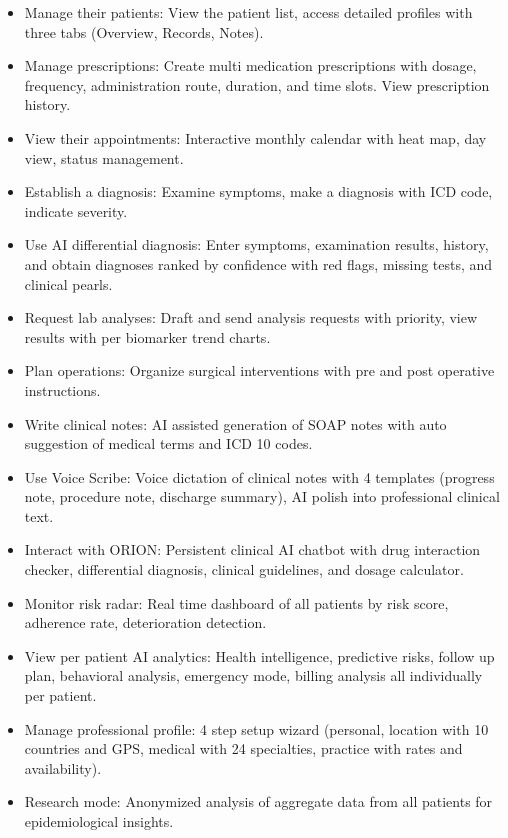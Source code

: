 \documentclass[12pt,a4paper,oneside]{report}
\begin{document}
\begin{itemize}
    \item Manage their patients: View the patient list, access detailed profiles with three tabs (Overview, Records, Notes).
    \item Manage prescriptions: Create multi medication prescriptions with dosage, frequency, administration route, duration, and time slots. View prescription history.
    \item View their appointments: Interactive monthly calendar with heat map, day view, status management.
    \item Establish a diagnosis: Examine symptoms, make a diagnosis with ICD code, indicate severity.
    \item Use AI differential diagnosis: Enter symptoms, examination results, history, and obtain diagnoses ranked by confidence with red flags, missing tests, and clinical pearls.
    \item Request lab analyses: Draft and send analysis requests with priority, view results with per biomarker trend charts.
    \item Plan operations: Organize surgical interventions with pre and post operative instructions.
    \item Write clinical notes: AI assisted generation of SOAP notes with auto suggestion of medical terms and ICD 10 codes.
    \item Use Voice Scribe: Voice dictation of clinical notes with 4 templates (progress note, procedure note, discharge summary), AI polish into professional clinical text.
    \item Interact with ORION: Persistent clinical AI chatbot with drug interaction checker, differential diagnosis, clinical guidelines, and dosage calculator.
    \item Monitor risk radar: Real time dashboard of all patients by risk score, adherence rate, deterioration detection.
    \item View per patient AI analytics: Health intelligence, predictive risks, follow up plan, behavioral analysis, emergency mode, billing analysis all individually per patient.
    \item Manage professional profile: 4 step setup wizard (personal, location with 10 countries and GPS, medical with 24 specialties, practice with rates and availability).
    \item Research mode: Anonymized analysis of aggregate data from all patients for epidemiological insights.
\end{itemize}
\end{document}
